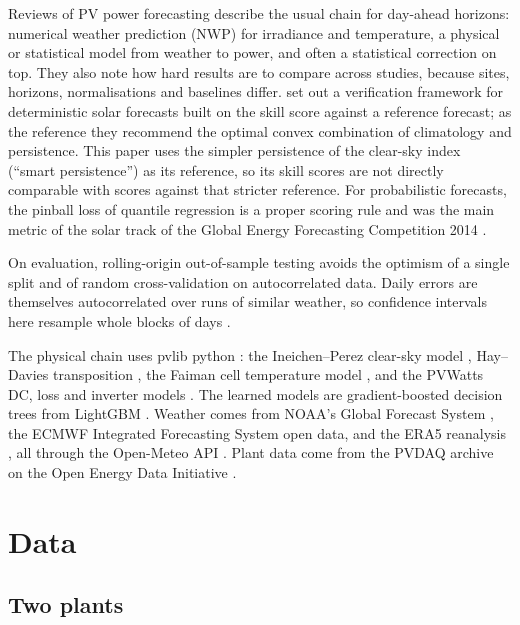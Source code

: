\documentclass[11pt]{article}
\begin{document}
Reviews of PV power forecasting \citep{antonanzas2016} describe the usual chain for day-ahead horizons: numerical weather prediction (NWP) for irradiance and temperature, a physical or statistical model from weather to power, and often a statistical correction on top. They also note how hard results are to compare across studies, because sites, horizons, normalisations and baselines differ. \citet{yang2020} set out a verification framework for deterministic solar forecasts built on the skill score against a reference forecast; as the reference they recommend the optimal convex combination of climatology and persistence. This paper uses the simpler persistence of the clear-sky index (``smart persistence'') as its reference, so its skill scores are not directly comparable with scores against that stricter reference. For probabilistic forecasts, the pinball loss of quantile regression \citep{koenker1978} is a proper scoring rule \citep{gneiting2007} and was the main metric of the solar track of the Global Energy Forecasting Competition 2014 \citep{hong2016}.

On evaluation, rolling-origin out-of-sample testing \citep{tashman2000} avoids the optimism of a single split and of random cross-validation on autocorrelated data. Daily errors are themselves autocorrelated over runs of similar weather, so confidence intervals here resample whole blocks of days \citep{kunsch1989}.

The physical chain uses pvlib python \citep{pvlib2018,pvlib2023}: the Ineichen--Perez clear-sky model \citep{ineichen2002}, Hay--Davies transposition \citep{hay1980}, the Faiman cell temperature model \citep{faiman2008}, and the PVWatts DC, loss and inverter models \citep{dobos2014}. The learned models are gradient-boosted decision trees from LightGBM \citep{ke2017}. Weather comes from NOAA's Global Forecast System \citep{gfs}, the ECMWF Integrated Forecasting System open data, and the ERA5 reanalysis \citep{hersbach2020}, all through the Open-Meteo API \citep{openmeteo}. Plant data come from the PVDAQ archive on the Open Energy Data Initiative \citep{pvdaq}.

\section{Data}

\subsection{Two plants}
\end{document}
